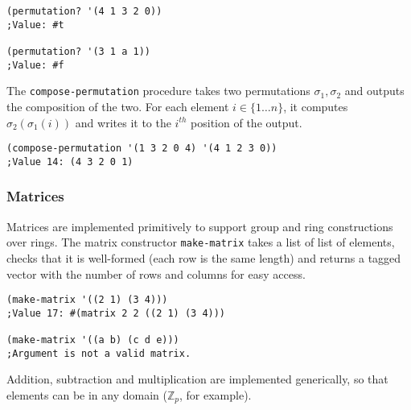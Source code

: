 \documentclass{article}
\begin{document}
\begin{verbatim}
(permutation? '(4 1 3 2 0))
;Value: #t

(permutation? '(3 1 a 1))
;Value: #f
\end{verbatim}
				
				The \texttt{compose-permutation} procedure takes two permutations $\sigma_1, \sigma_2$ and outputs the composition of the two. For each element $i \in \{1 \ldots n\}$, it computes $\sigma_2(\sigma_1(i))$ and writes it to the $i^{th}$ position of the output.

\begin{verbatim}
(compose-permutation '(1 3 2 0 4) '(4 1 2 3 0))
;Value 14: (4 3 2 0 1)
\end{verbatim}

            \subsubsection{Matrices}

				Matrices are implemented primitively to support group and ring constructions over rings. The matrix constructor \texttt{make-matrix} takes a list of list of elements, checks that it is well-formed (each row is the same length) and returns a tagged vector with the number of rows and columns for easy access.

\begin{verbatim}
(make-matrix '((2 1) (3 4)))
;Value 17: #(matrix 2 2 ((2 1) (3 4)))

(make-matrix '((a b) (c d e)))
;Argument is not a valid matrix.
\end{verbatim}
				
				Addition, subtraction and multiplication are implemented generically, so that elements can be in any domain ($\mathbb{Z}_p$, for example).
\end{document}
